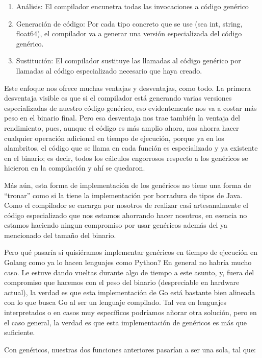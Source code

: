 \documentclass[11pt]{article}
\begin{document}
\begin{enumerate}
\item Análisis: El compilador encunetra todas las invocaciones a código genérico
\item Generación de código: Por cada tipo concreto que se use (sea int, string, float64), el compilador va a generar una versión especializada del código genérico.
\item Sustitución: El compilador sustituye las llamadas al código genérico por llamadas al código especializado necesario que haya creado.
\end{enumerate}

Este enfoque nos ofrece muchas ventajas y desventajas, como todo. La primera desventaja visible es que si el compilador está generando varias versiones especializadas de nuestro código genérico, eso evidentemente nos va a costar más peso en el binario final.
Pero esa desventaja nos trae también la ventaja del rendimiento, pues, aunque el código es más amplio ahora, nos ahorra hacer cualquier operación adicional en tiempo de ejecución, porque ya en los alambritos, el código que se llama en cada función es especializado y ya existente en el binario; es decir, todos los cálculos engorrosos respecto a los genéricos se hicieron en la compilación y ahí se quedaron.

Más aún, esta forma de implementación de los genéricos no tiene una forma de ``tronar'' como si la tiene la implementación por borradura de tipos de Java. Como el compilador se encarga por nosotros de realizar casi artesanalmente el código especializado que nos estamos ahorrando hacer nosotros, en esencia no estamos haciendo ningun compromiso por usar genéricos además del ya mencionado del tamaño del binario.

Pero qué pasaría si quisiéramos implementar genéricos en tiempo de ejecución en Golang como ya lo hacen lenguajes como Python? En general no habría mucho caso. Le estuve dando vueltas durante algo de tiempo a este asunto, y, fuera del compromiso que hacemos con el peso del binario (despreciable en hardware actual), la verdad es que esta implementación de Go está bastante bien alineada con lo que busca Go al ser un lenguaje compilado. Tal vez en lenguajes interpretados o en casos muy específicos podríamos añorar otra solución, pero en el caso general, la verdad es que esta implementación de genéricos es más que suficiente.

Con genéricos, nuestras dos funciones anteriores pasarían a ser una sola, tal que:
\end{document}
